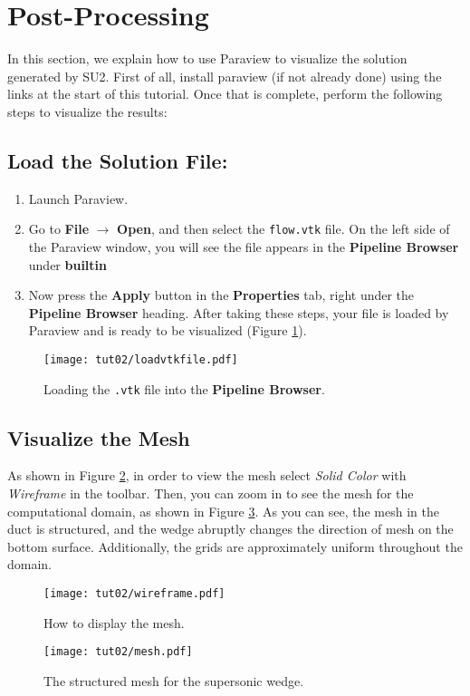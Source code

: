 \section*{Post-Processing}
In this section, we explain how to use Paraview to visualize the solution generated by SU2. First of all, install paraview (if not already done) using the links at the start of this tutorial. Once that is complete, perform the following steps to visualize the results:
\subsection{Load the Solution File:}
\begin{enumerate}[label=\arabic*)]
	\item Launch Paraview.
	\item Go to \textbf{File} $\rightarrow$ \textbf{Open}, and then select the \texttt{flow.vtk} file. On the left side of the Paraview window, you will see the file appears in the \textbf{Pipeline Browser} under \textbf{builtin}
	\item Now press the \textbf{Apply} button in the \textbf{Properties} tab, right under the \textbf{Pipeline Browser} heading. After taking these steps, your file is loaded by Paraview and is ready to be visualized (Figure \ref{fig2:load}).
\end{enumerate}
\begin{figure}[ht]
    \centering
    \texttt{[image: tut02/loadvtkfile.pdf]}
    \caption{Loading the \texttt{.vtk} file into the \textbf{Pipeline Browser}.}
    \label{fig2:load}
\end{figure}
\subsection{Visualize the Mesh}
As shown in Figure \ref{fig2:wireframe}, in order to view the mesh select \textit{Solid Color} with \textit{Wireframe} in the toolbar. Then, you can zoom in to see the mesh for the computational domain, as shown in Figure \ref{fig2:mesh}. As you can see, the mesh in the duct is structured, and the wedge abruptly changes the direction of mesh on the bottom surface. Additionally, the grids are approximately uniform throughout the domain.
\begin{figure}[ht]
    \centering
    \texttt{[image: tut02/wireframe.pdf]}
    \caption{How to display the mesh.}
    \label{fig2:wireframe}
\end{figure}
\begin{figure}[ht]
    \centering
    \texttt{[image: tut02/mesh.pdf]}
    \caption{The structured mesh for the supersonic wedge.}
    \label{fig2:mesh}
\end{figure}
